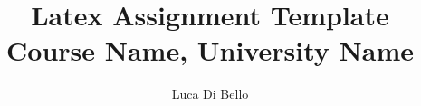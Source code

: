 \documentclass[a4paper, 11pt]{article}
\title{Latex Assignment Template\\\large Course Name, University Name}
\author{Luca Di Bello}
\date{\displaydate{today}}
\begin{document}
\maketitle



\nocite{*} %
\printbibliography
\end{document}
